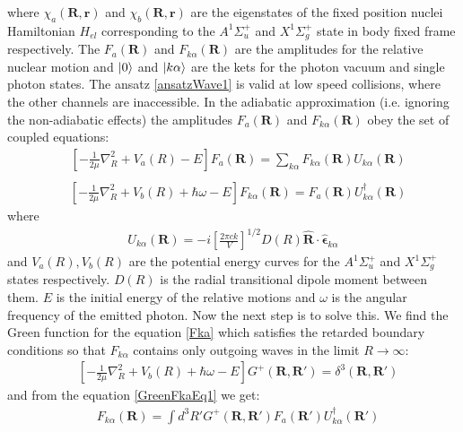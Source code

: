 where $ \chi_a(\mathbf{R},\mathbf{r}) $ and $ \chi_b(\mathbf{R},\mathbf{r}) $ are the eigenstates of the fixed position nuclei Hamiltonian $ H_{el} $ corresponding to the $ A^{1}\Sigma^{+}_u $  and $ X^{1}\Sigma^{+}_g $ state in body fixed frame respectively. The $ F_a(\mathbf{R}) $ and $ F_{k\alpha}(\mathbf{R}) $ are the amplitudes for the relative nuclear motion and $ \Ket{0} $ and $ \Ket{k\alpha} $ are the kets for the photon vacuum and single photon states. The ansatz \eqref{ansatzWave1} is valid at low speed collisions, where the other channels are inaccessible. In the adiabatic approximation (i.e. ignoring the non-adiabatic effects) the amplitudes $ F_a(\mathbf{R}) $ and $ F_{k\alpha}(\mathbf{R}) $ obey the set of coupled equations:
\begin{equation}\label{Fk}
\begin{split}
& \left[-\frac{1}{2\mu}\nabla^2_{R} + V_a(R) - E\right]F_a(\mathbf{R}) = \sum_{k\alpha}{F_{k\alpha}(\mathbf{R})U_{k\alpha}(\mathbf{R}) } \\[.8em]
\end{split}
\end{equation}
\begin{equation}\label{Fka}
\begin{split}
& \left[-\frac{1}{2\mu}\nabla^2_{R} + V_b(R) + \hbar\omega - E\right]F_{k\alpha}(\mathbf{R}) = F_a(\mathbf{R})U^{\dagger}_{k\alpha}(\mathbf{R}) 
\end{split}
\end{equation}
where
\begin{equation}
\begin{split}
U_{k\alpha}(\mathbf{R}) = -i\left[\frac{2\pi c k}{V}\right]^{1/2}D(R)\hat{\mathbf{R}}\cdot\hat{\mathbf{\epsilon}}_{k\alpha}
\end{split}
\end{equation}
and $ V_a(R), V_b(R) $ are the potential energy curves for the $ A^{1}\Sigma^{+}_u $ and $ X^{1}\Sigma^{+}_g $ states respectively.   $ D(R) $ is the radial transitional dipole moment between them. $ E $ is the initial energy of the relative motions and $ \omega $ is the angular frequency of the emitted photon. 
Now the next step is to solve this. We find the Green function for the equation \eqref{Fka} which satisfies the retarded boundary conditions so that $ F_{k\alpha} $ contains only outgoing waves in the limit $ R \rightarrow \infty $:
\begin{equation}\label{GreenFkaEq1}
\begin{split}
& \left[-\frac{1}{2\mu}\nabla^2_{R} + V_b(R) + \hbar\omega - E\right]G^{+}(\mathbf{R}, \mathbf{R}') =  \delta^3(\mathbf{R}, \mathbf{R}')
\end{split}
\end{equation}
and from the equation \eqref{GreenFkaEq1} we get:
\begin{equation}\label{FkaInt1}
\begin{split}
& F_{k\alpha}(\mathbf{R}) = \int{d^3R'G^{+}(\mathbf{R}, \mathbf{R}')F_{a}(\mathbf{R}')U^{\dagger}_{k\alpha}(\mathbf{R}')   }
\end{split}
\end{equation}

